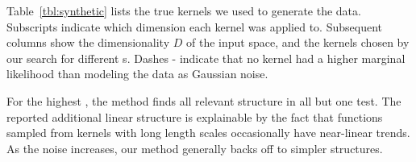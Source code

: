 


Table~\ref{tbl:synthetic} lists the true kernels we used to generate the data.
Subscripts indicate which dimension each kernel was applied to.
Subsequent columns show the dimensionality $D$ of the input space, and the kernels chosen by our search for different \SNR{}s.
Dashes - indicate that no kernel had a higher marginal likelihood than modeling the data as \iid Gaussian noise. %

For the highest \SNR{}, the method finds all relevant structure in all but one test.
The reported additional linear structure is explainable by the fact that functions sampled from \kSE{} kernels with long length scales occasionally have near-linear trends.
%
As the noise increases, our method generally backs off to simpler structures.

